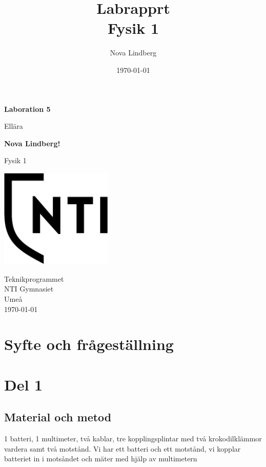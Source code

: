 \documentclass[11p]{article}
\title{Labrapprt \\ \small Fysik 1}
\author{Nova Lindberg }
\date{\today}
\begin{document}
    \begin{titlepage}
        \begin{center}
            \vspace*{1cm}

            \Huge
            \textbf{Laboration 5}

            \vspace{0.5cm}
            \LARGE
            Ellära

            \vspace{1.5cm}

            \textbf{Nova Lindberg!}

            \vfill


            Fysik 1

            \vspace{0.8cm}

            \includegraphics[width=0.4\textwidth]{../images/NTI.png}

            \Large
            Teknikprogrammet\\
            NTI Gymnasiet\\
            Umeå\\
            \today

        \end{center}
    \end{titlepage}
    \section{Syfte och frågeställning}
    \section{Del 1}
    \subsection{Material och metod}
    1 batteri, 1 multimeter, två kablar, tre kopplingsplintar med två krokodilklämmor vardera samt två motstånd.
    Vi har ett batteri och ett motstånd, vi kopplar batteriet in i motsåndet och mäter med hjälp av multimetern
\end{document}
